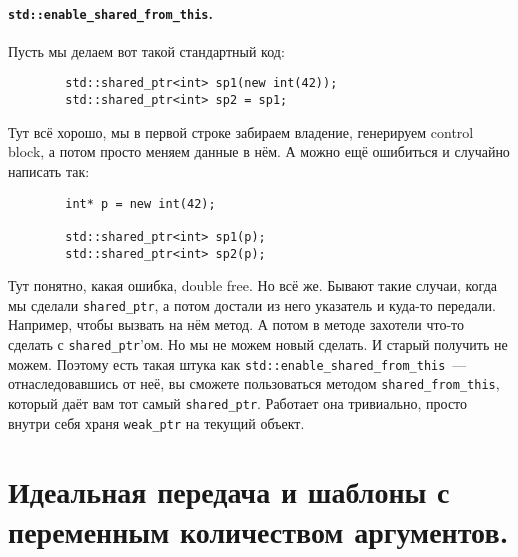 \documentclass{article}
\begin{document}
    \paragraph{\texttt{std::enable_shared_from_this}.}
    Пусть мы делаем вот такой стандартный код:
    \begin{verbatim}
        std::shared_ptr<int> sp1(new int(42));
        std::shared_ptr<int> sp2 = sp1;
    \end{verbatim}
    Тут всё хорошо, мы в первой строке забираем владение, генерируем control block, а потом просто меняем данные в нём. А можно ещё ошибиться и случайно написать так:
    \begin{verbatim}
        int* p = new int(42);

        std::shared_ptr<int> sp1(p);
        std::shared_ptr<int> sp2(p);
    \end{verbatim}
    Тут понятно, какая ошибка, double free. Но всё же. Бывают такие случаи, когда мы сделали \texttt{shared_ptr}, а потом достали из него указатель и куда-то передали. Например, чтобы вызвать на нём метод. А потом в методе захотели что-то сделать с \texttt{shared_ptr}'ом. Но мы не можем новый сделать. И старый получить не можем. Поэтому есть такая штука как \texttt{std::enable_shared_from_this}~--- отнаследовавшись от неё, вы сможете пользоваться методом \texttt{shared_from_this}, который даёт вам тот самый \texttt{shared_ptr}. Работает она тривиально, просто внутри себя храня \texttt{weak_ptr} на текущий объект.
    \section{Идеальная передача и шаблоны с переменным количеством аргументов.}
\end{document}
